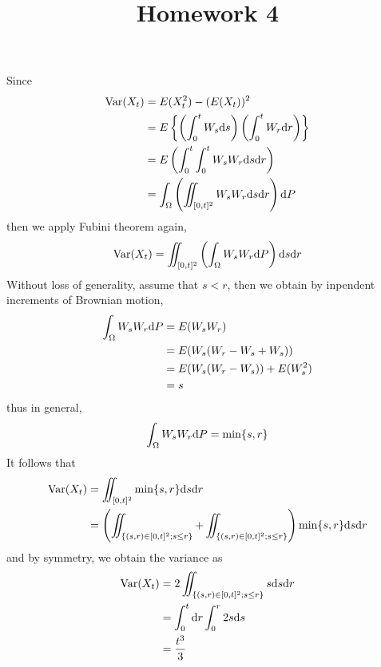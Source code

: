 \documentclass{homework}
\title{Homework 4}
\DeclareMathOperator{\var}{Var}
\begin{document}
    \maketitle

    \problem
    Since
    \[\begin{aligned}
        \var(X_t)&=E(X_t^2)-(E(X_t))^2\\
        &=E\left\{\left(\int_0^tW_s\diff s\right)
        \left(\int_0^tW_r\diff r\right)\right\}\\
        &=E\left(\int_0^t\int_0^tW_sW_r\diff s\diff r\right)\\
        &=\int_\Omega\left(\iint_{[0,t]^2}W_sW_r\diff s\diff r\right)\diff P
    \end{aligned}\]
    then we apply Fubini theorem again,
    \[\var(X_t)=\iint_{[0,t]^2}
    \left(\int_\Omega W_sW_r\diff P\right)\diff s\diff r\]
    Without loss of generality, assume that $s<r$, then we obtain
    by inpendent increments of Brownian motion,
    \[\begin{aligned}
        \int_\Omega W_sW_r\mathrm d P&=E(W_sW_r)\\
        &=E(W_s(W_r-W_s+W_s))\\
        &=E(W_s(W_r-W_s))+E(W_s^2)\\
        &=s
    \end{aligned}\]
    thus in general,
    \[\int_\Omega W_sW_r\mathrm d P=\min\{s,r\}\]
    It follows that
    \[\begin{aligned}
        \var(X_t)&=\iint_{[0,t]^2}\min\{s,r\}\diff s\diff r\\
        &=\left(\iint_{\{(s,r)\in[0,t]^2;s\leq r\}}
                +\iint_{\{(s,r)\in[0,t]^2;s\leq r\}}\right)
        \min\{s,r\}\diff s\diff r\\
    \end{aligned}\]
    and by symmetry, we obtain the variance as
    \[\begin{aligned}
        \var(X_t)&=2\iint_{\{(s,r)\in[0,t]^2;s\leq r\}}s\diff s\diff r\\
        &=\int_0^t\diff r\int_0^r2s\diff s\\
        &=\frac{t^3}{3}
    \end{aligned}\]

    \problem
\end{document}
